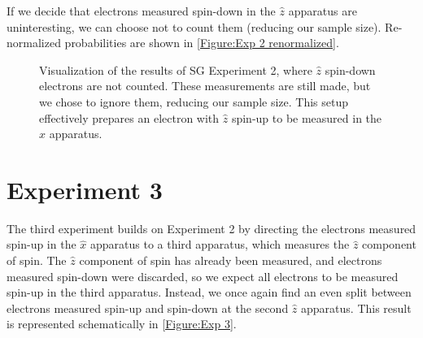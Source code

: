 If we decide that electrons measured spin-down in the $\hat{z}$ apparatus are uninteresting, we can choose not to count them (reducing our sample size). Re-normalized probabilities are shown in \autoref{Figure:Exp 2 renormalized}.

\begin{figure}
\centering\CaptionFontSize
{}

\caption[Re-normalized results of Stern-Gerlach Experiment 2]
{Visualization of the results of SG Experiment 2, where $\hat{z}$ spin-down electrons are not counted. These measurements are still made, but we chose to ignore them, reducing our sample size. This setup effectively prepares an electron with $\hat{z}$ spin-up to be measured in the $\hat{x}$ apparatus.}
\label{Figure:Exp 2 renormalized}
\end{figure}

\section{Experiment 3}
The third experiment builds on Experiment 2 by directing the electrons measured spin-up in the $\hat{x}$ apparatus to a third apparatus, which measures the $\hat{z}$ component of spin. The $\hat{z}$ component of spin has already been measured, and electrons measured spin-down were discarded, so we expect all electrons to be measured spin-up in the third apparatus. Instead, we once again find an even split between electrons measured spin-up and spin-down at the second $\hat{z}$ apparatus. This result is represented schematically in \autoref{Figure:Exp 3}.


